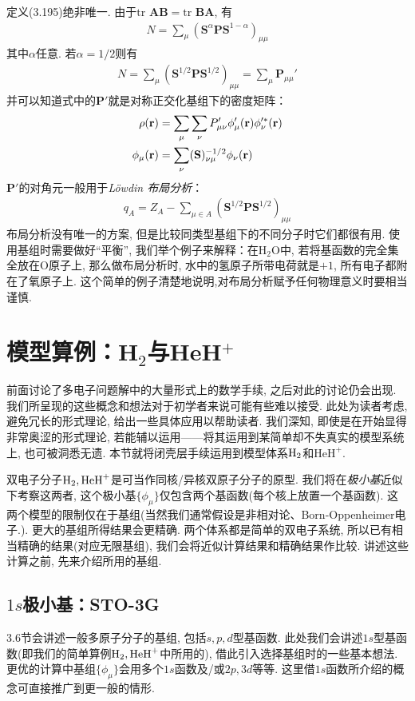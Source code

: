 定义(3.195)绝非唯一. 由于$\mathrm{tr}\,\,\mathbf{AB}=\mathrm{tr}\,\,\mathbf{BA}$, 有
\begin{align}
N = \sum_\mu (\mathbf{S}^\alpha\mathbf{PS}^{1-\alpha})_{\mu\mu}
\end{align}
其中$\alpha$任意. 若$\alpha=1/2$则有
\begin{align}
\label{3.198}
N = \sum_\mu (\mathbf{S}^{1/2}\mathbf{PS}^{1/2})_{\mu\mu} = \sum_\mu \mathbf{P}_{\mu\mu}'
\end{align}
并可以知道式中的$\mathbf{P}'$就是对称正交化基组下的密度矩阵：
\begin{align}
\rho(\mathbf{r}) &= \sum_\mu\sum_\nu P'_{\mu\nu}\phi_\mu'(\mathbf{r})\phi_\nu^{\prime *}(\mathbf{r})\\
\phi_{\mu}(\mathbf{r}) &= \sum_\nu(\mathbf{S})^{-1/2}_{\nu\mu}\phi_\nu(\mathbf{r})
\end{align}
$\mathbf{P}'$的对角元一般用于\emph{L\"owdin 布局分析}：
\begin{align}
q_A = Z_A - \sum_{\mu\in A}(\mathbf{S}^{1/2}\mathbf{PS}^{1/2})_{\mu\mu}
\end{align}
布局分析没有唯一的方案, 但是比较同类型基组下的不同分子时它们都很有用. 使用基组时需要做好``平衡'', 我们举个例子来解释：在$\mathrm{H}_2\mathrm{O}$中, 若将基函数的完全集全放在$\mathrm{O}$原子上, 那么做布局分析时, 水中的氢原子所带电荷就是$+1$, 所有电子都附在了氧原子上. 这个简单的例子清楚地说明,对布局分析赋予任何物理意义时要相当谨慎.
\section{模型算例：H$_2$与HeH$^+$}
前面讨论了多电子问题解中的大量形式上的数学手续, 之后对此的讨论仍会出现. 我们所呈现的这些概念和想法对于初学者来说可能有些难以接受. 此处为读者考虑, 避免冗长的形式理论, 给出一些具体应用以帮助读者. 我们深知, 即使是在开始显得非常奥涩的形式理论, 若能辅以运用——将其运用到某简单却不失真实的模型系统上, 也可被洞悉无遗. 本节就将闭壳层\hft 手续运用到模型体系$\mathrm{H}_2$和$\mathrm{HeH}^+$.

双电子分子$\mathrm{H}_2,\mathrm{HeH}^+$是可当作同核/异核双原子分子的原型. 我们将在\emph{极小基}近似下考察这两者, 这个极小基$\{\phi_\mu\}$仅包含两个基函数(每个核上放置一个基函数). 这两个模型的限制仅在于基组(当然我们通常假设是非相对论、Born-Oppenheimer电子\ha.). 更大的基组所得结果会更精确. 两个体系都是简单的双电子系统, 所以已有相当精确的结果(对应无限基组), 我们会将近似计算结果和精确结果作比较. 讲述这些计算之前, 先来介绍所用的基组.
\subsection{$1s$极小基：STO-3G}
\label{sec3.5.1}
3.6节会讲述一般多原子分子的基组, 包括$s,p,d$型基函数. 此处我们会讲述$1s$型基函数(即我们的简单算例$\mathrm{H}_2,\mathrm{HeH}^+$中所用的), 借此引入选择基组时的一些基本想法. 更优的计算中基组$\{\phi_\mu\}$会用多个$1s$函数及/或$2p,3d$等等. 这里借$1s$函数所介绍的概念可直接推广到更一般的情形.

